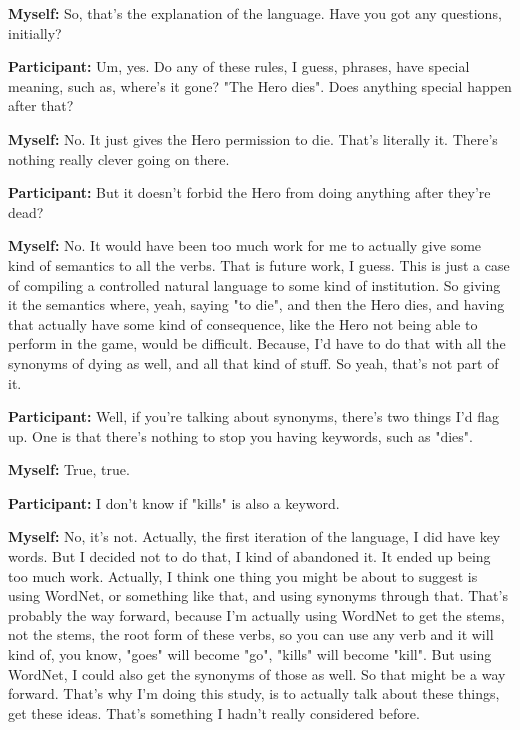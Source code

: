 \documentclass[11pt]{report}
\newcommand{\llabel}[1]{\hypertarget{llineno:#1}{\linelabel{#1}}}
\begin{document}
\begin{linenumbers}
\textbf{Myself:} So, that's the explanation of the language. Have you got any questions, initially?

\textbf{Participant:} Um, yes. Do any of these rules, I guess, phrases, have
special meaning, such as, where's it gone? "The Hero dies". Does anything
special happen after that?\llabel{lne:feature4h}

\textbf{Myself:} No. It just gives the Hero permission to die. That's literally it. There's nothing really clever going on there.

\textbf{Participant:} But it doesn't forbid the Hero from doing anything after they're dead?

\textbf{Myself:} No. It would have been too much work for me to actually give some kind of semantics to all the verbs. That is future work, I guess. This is just a case of compiling a controlled natural language to some kind of institution. So giving it the semantics where, yeah, saying "to die", and then the Hero dies, and having that actually have some kind of consequence, like the Hero not being able to perform in the game, would be difficult. Because, I'd have to do that with all the synonyms of dying as well, and all that kind of stuff. So yeah, that's not part of it.

\textbf{Participant:} Well, if you're talking about synonyms, there's two things I'd flag up. One is that there's nothing to stop you having keywords, such as "dies".

\textbf{Myself:} True, true.

\textbf{Participant:} I don't know if "kills" is also a keyword.

\textbf{Myself:} No, it's not. Actually, the first iteration of the language, I did have key words. But I decided not to do that, I kind of abandoned it. It ended up being too much work. Actually, I think one thing you might be about to suggest is using WordNet, or something like that, and using synonyms through that. That's probably the way forward, because I'm actually using WordNet to get the stems, not the stems, the root form of these verbs, so you can use any verb and it will kind of, you know, "goes" will become "go", "kills" will become "kill". But using WordNet, I could also get the synonyms of those as well. So that might be a way forward. That's why I'm doing this study, is to actually talk about these things, get these ideas. That's something I hadn't really considered before.


\end{linenumbers}
\end{document}
